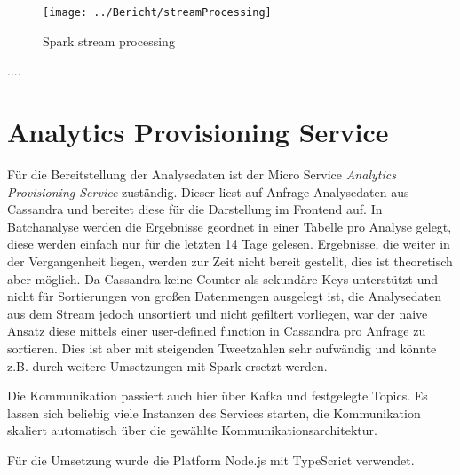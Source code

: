 \begin{figure}[h]
\centering
\texttt{[image: ../Bericht/streamProcessing]}
\caption{Spark stream processing}
\label{fig:streamProcessing}
\end{figure}

....



\section{Analytics Provisioning Service}

Für die Bereitstellung der Analysedaten ist der Micro Service \textit{Analytics Provisioning Service} zuständig. 
Dieser liest auf Anfrage Analysedaten aus Cassandra und bereitet diese für die Darstellung im Frontend auf.
In Batchanalyse werden die Ergebnisse geordnet in einer Tabelle pro Analyse gelegt, diese werden einfach nur für die letzten 14 Tage gelesen. Ergebnisse, die weiter in der Vergangenheit liegen, werden zur Zeit nicht bereit gestellt, dies ist theoretisch aber möglich.
Da Cassandra keine Counter als sekundäre Keys unterstützt und nicht für Sortierungen von großen Datenmengen ausgelegt ist,
die Analysedaten aus dem Stream jedoch unsortiert und nicht gefiltert vorliegen, war der naive Ansatz diese mittels einer  user-defined function in Cassandra pro Anfrage zu sortieren. Dies ist aber mit steigenden Tweetzahlen sehr aufwändig und könnte z.B. durch weitere Umsetzungen mit Spark ersetzt werden.

Die Kommunikation passiert auch hier über Kafka und festgelegte Topics.
Es lassen sich beliebig viele Instanzen des Services starten, die Kommunikation skaliert automatisch über die gewählte Kommunikationsarchitektur.

Für die Umsetzung wurde die Platform Node.js mit TypeScrict verwendet. 